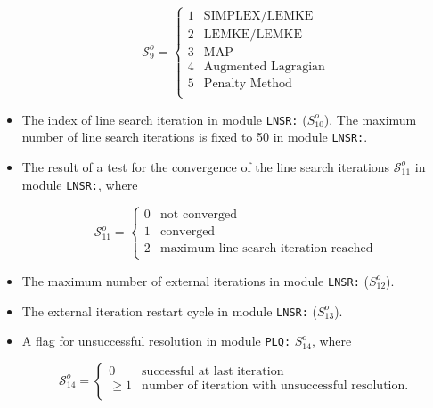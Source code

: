 \begin{itemize}
\begin{displaymath}
\mathcal{S}^{o}_{9} = \left\{
\begin{array}{rl}
 1 & \textrm{SIMPLEX/LEMKE} \\
 2 & \textrm{LEMKE/LEMKE} \\
 3 & \textrm{MAP} \\
 4 & \textrm{Augmented Lagragian} \\
 5 & \textrm{Penalty Method} \\
\end{array} \right.
\end{displaymath}

\item The index of line search iteration in module {\tt LNSR:} (${S}^{o}_{10}$). The maximum number of line search iterations is fixed to 50 in module {\tt LNSR:}.

\item The result of a test for the convergence of the line search iterations $\mathcal{S}^{o}_{11}$ in module {\tt LNSR:}, where

\begin{displaymath}
\mathcal{S}^{o}_{11} = \left\{
\begin{array}{rl}
 0 & \textrm{not converged} \\
 1 & \textrm{converged} \\
 2 & \textrm{maximum line search iteration reached} \\
\end{array} \right.
\end{displaymath}

\item The maximum number of external iterations in module {\tt LNSR:} (${S}^{o}_{12}$).

\item The external iteration restart cycle in module {\tt LNSR:} (${S}^{o}_{13}$).

\item A flag for unsuccessful resolution in module {\tt PLQ:} ${S}^{o}_{14}$, where

\begin{displaymath}
\mathcal{S}^{o}_{14} = \left\{
\begin{array}{rl}
 0 & \textrm{successful at last iteration} \\
 \ge 1 & \textrm{number of iteration with unsuccessful resolution.} \\
\end{array} \right.
\end{displaymath}

\end{itemize}

